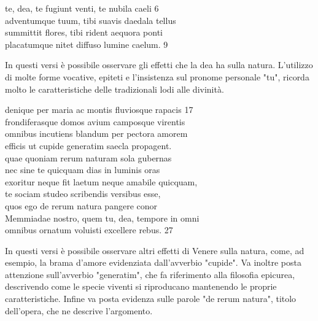 \documentclass[10pt,a4paper]{article}
\begin{document}
	\begin{estratto}
		te, dea, te fugiunt venti, te nubila caeli 6\\
		adventumque tuum, tibi suavis daedala tellus \\
		summittit flores, tibi rident aequora ponti \\
		placatumque nitet diffuso lumine caelum. 9
	\end{estratto}

	In questi versi è possibile osservare gli effetti che la dea ha sulla natura. L'utilizzo di molte forme vocative, epiteti e l'insistenza sul pronome personale "tu", ricorda molto le caratteristiche delle tradizionali lodi alle divinità.
	
	\begin{estratto}
		denique per maria ac montis fluviosque rapacis 17  \\
		frondiferasque domos avium camposque virentis \\
		omnibus incutiens blandum per pectora amorem \\
		efficis ut cupide generatim saecla propagent. \\           
		quae quoniam rerum naturam sola gubernas \\
		nec sine te quicquam dias in luminis oras \\
		exoritur neque fit laetum neque amabile quicquam, \\
		te sociam studeo scribendis versibus esse, \\
		quos ego de rerum natura pangere conor \\        
		Memmiadae nostro, quem tu, dea, tempore in omni \\
		omnibus ornatum voluisti excellere rebus.	27
	\end{estratto}

	In questi versi è possibile osservare altri effetti di Venere sulla natura, come, ad esempio, la brama d'amore evidenziata dall'avverbio "cupide". Va inoltre posta attenzione sull'avverbio "generatim", che fa riferimento alla filosofia epicurea, descrivendo come le specie viventi si riproducano mantenendo le proprie caratteristiche. Infine va posta evidenza sulle parole "de rerum natura", titolo dell'opera, che ne descrive l'argomento.
	
\end{document}
